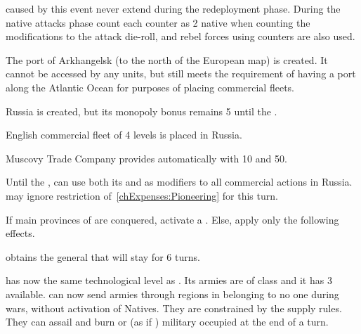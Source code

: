 \phinter
\aparag \REVOLT caused by this event never extend during the redeployment
phase.
\aparag During the native attacks phase count each \REVOLT \facemoins counter
as 2 native \DT when counting the modifications to the attack die-roll, and
rebel forces using \payssiberie counters are also used.






\phevnt

\aparag The port of Arkhangelsk (to the north of the European map) is created.
It cannot be accessed by any units, but still meets the requirement of having
a port along the Atlantic Ocean for purposes of placing commercial fleets.

\aparag \CTZ Russia is created, but its monopoly bonus remains 5 until the
.

\aparag English commercial fleet of 4 levels is placed in \CTZ Russia.

\aparag Muscovy Trade Company provides \ENG automatically with 10 \VP and
50\ducats.

\phadm

\aparag Until the , \ENG can use both
its \DTI and \FTI as modifiers to all commercial actions in \CTZ Russia.
\aparag \RUS may ignore restriction of~\ref{chExpenses:Pioneering} for this
turn.





\phevnt

\condition{}
\aparag If main provinces of \paysperse are conquered, activate a
.
\aparag Else, apply only the following effects.

\phevnt
\aparag \paysperse obtains the general  that will stay for
6 turns.

\effetlong
\aparag \paysperse has now the same technological level as \TUR.  Its armies
are of class \CAI and it has 3 \ARMY available.
\aparag \paysperse can now send armies through regions in \ROTW belonging to
no one during wars, without activation of Natives. They are constrained by the
supply rules. They can assail and burn \TP or \COL (as if \TP) military
occupied at the end of a turn.




